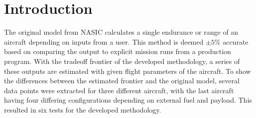 \section{Introduction}
The original model from NASIC calculates a single endurance or range of an aircraft depending on inputs from a user. This method is deemed $\pm 5\%$ accurate based on comparing the output to explicit mission runs from a production program. With the tradeoff frontier of the developed methodology, a series of these outputs are estimated with given flight parameters of the aircraft. To show the differences between the estimated frontier and the original model, several data points were extracted for three different aircraft, with the last aircraft having four differing configurations depending on external fuel and payload. This resulted in six tests for the developed methodology.\par
